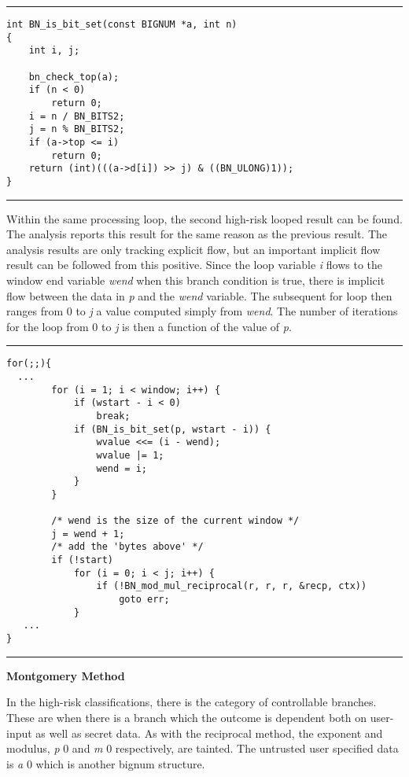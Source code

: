 \documentclass[11pt,a4paper]{article}
\newcommand{\codevar}[1]{\textit{#1}}
\newcommand{\ruleabove}{\vspace{5pt}\hrule}
\newcommand{\rulebelow}{\hrule\vspace{5pt}}
\begin{document}
\ruleabove
\begin{lstlisting}[caption=OpenSSL 1.1.0g - bn\_lib.c lines 741 - 753]
int BN_is_bit_set(const BIGNUM *a, int n)
{
    int i, j;

    bn_check_top(a);
    if (n < 0)
        return 0;
    i = n / BN_BITS2;
    j = n % BN_BITS2;
    if (a->top <= i)
        return 0;
    return (int)(((a->d[i]) >> j) & ((BN_ULONG)1));
}
\end{lstlisting}
\rulebelow

Within the same processing loop, the second high-risk looped result can be
found. The analysis reports this result for the same reason as the previous
result. The analysis results are only tracking explicit flow, but an important
implicit flow result can be followed from this positive. Since the loop variable
\codevar{i} flows to the window end variable \codevar{wend} when this branch condition is true,
there is implicit flow between the data in \codevar{p} and the \codevar{wend} variable.  The
subsequent for loop then ranges from 0 to \codevar{j} a value computed simply from \codevar{wend}.
The number of iterations for the loop from 0 to \codevar{j} is then a function of the
value of \codevar{p}.

\ruleabove
\begin{lstlisting}[caption=OpenSSL 1.1.0g - bn\_exp.c lines 250-297]
for(;;){
  ...
        for (i = 1; i < window; i++) {
            if (wstart - i < 0)
                break;
            if (BN_is_bit_set(p, wstart - i)) {
                wvalue <<= (i - wend);
                wvalue |= 1;
                wend = i;
            }
        }

        /* wend is the size of the current window */
        j = wend + 1;
        /* add the 'bytes above' */
        if (!start)
            for (i = 0; i < j; i++) {
                if (!BN_mod_mul_reciprocal(r, r, r, &recp, ctx))
                    goto err;
            }
   ...
}
\end{lstlisting}
\rulebelow

\noindent
\textbf{Montgomery Method}

   In the high-risk classifications, there is the category of controllable
   branches. These are when there is a branch which the outcome is dependent
   both on user-input as well as secret data. As with the reciprocal method, the
   exponent and modulus, \codevar{p} 0 and \codevar{m} 0 respectively, are tainted. The
   untrusted user specified data is \codevar{a} 0 which is another bignum structure.
   
\end{document}
